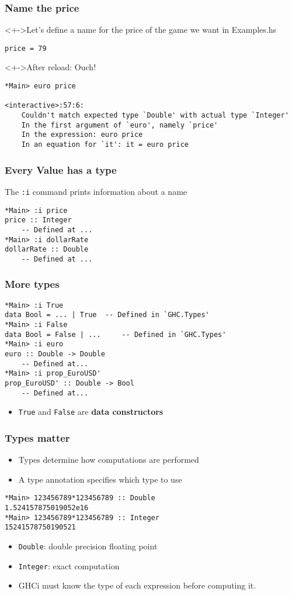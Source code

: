 \documentclass{beamer}
\begin{document}
\begin{frame}[fragile]
  \frametitle{Name the price}
  \begin{block}<+->{Let's define a name for the price of the game we want
      in Examples.hs}
\begin{verbatim}
price = 79
\end{verbatim}
  \end{block}
  \begin{alertblock}<+->{After reload: Ouch!}
\begin{verbatim}
*Main> euro price

<interactive>:57:6:
    Couldn't match expected type `Double' with actual type `Integer'
    In the first argument of `euro', namely `price'
    In the expression: euro price
    In an equation for `it': it = euro price
\end{verbatim}
  \end{alertblock}
\end{frame}
\begin{frame}[fragile]
  \frametitle{Every Value has a type}
  The \texttt{:i} command prints information about a name
\begin{verbatim}
*Main> :i price
price :: Integer
  	-- Defined at ...
*Main> :i dollarRate
dollarRate :: Double
  	-- Defined at ...
\end{verbatim}
\end{frame}
\begin{frame}[fragile]
  \frametitle{More types}
\begin{verbatim}
*Main> :i True
data Bool = ... | True 	-- Defined in `GHC.Types'
*Main> :i False
data Bool = False | ... 	-- Defined in `GHC.Types'
*Main> :i euro
euro :: Double -> Double
  	-- Defined at...
*Main> :i prop_EuroUSD'
prop_EuroUSD' :: Double -> Bool
  	-- Defined at...
\end{verbatim}
  \begin{itemize}
  \item \texttt{True} and \texttt{False} are \textbf{data constructors}
  \end{itemize}
\end{frame}
\begin{frame}[fragile]
  \frametitle{Types matter}
  \begin{itemize}
  \item Types determine how computations are performed
  \item A type annotation specifies which type to use
  \end{itemize}
\begin{verbatim}
*Main> 123456789*123456789 :: Double
1.524157875019052e16
*Main> 123456789*123456789 :: Integer
15241578750190521
\end{verbatim}
  \begin{itemize}
  \item \texttt{Double}: double precision floating point 
  \item  \texttt{Integer}: exact computation
  \item  GHCi must know the type of each expression before computing it.
  \end{itemize}
\end{frame}
\end{document}
